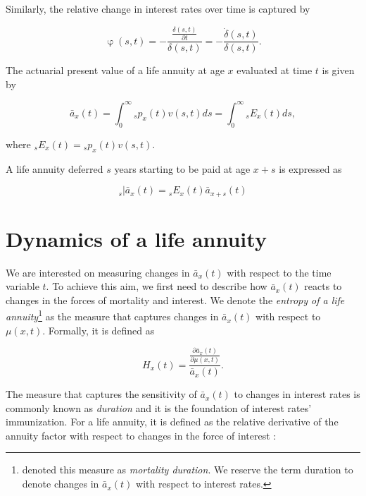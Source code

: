 \documentclass[12pt]{article}
\begin{document}
Similarly, the relative change in interest rates over time is captured by 


\begin{equation} \label{eq:phi}
\upvarphi(s,t)=-\frac{\frac{\delta(s,t)}{\partial t}}{\delta(s,t)} = -\frac{\dot{\delta}(s,t)}{\delta(s,t)}.
\end{equation}


The actuarial present value of a life annuity at age $x$ evaluated at time $t$ is given by

\begin{equation}\label{eq:Annuity}
\bar{a}_x(t) = \int_0^\infty {}_sp_x(t) {v}(s,t)ds = \int_0^\infty {}_sE_x(t) ds,
\end{equation}

where ${}_sE_x(t)={}_sp_x(t) {v}(s,t)$. 



A life annuity deferred $s$ years starting to be paid at age $x+s$ is expressed as


\begin{equation}\label{eq:DefAnnuity}
{}_s|\bar{a}_x(t) = {}_sE_x(t) \bar{a}_{x+s}(t)
\end{equation}


\section{Dynamics of a life annuity}


We are interested on measuring changes in $\bar{a}_x(t)$ with respect to the time variable $t$. To achieve this aim, we first need to describe how $\bar{a}_x(t)$ reacts to changes in the forces of mortality and interest. We denote the \textit{entropy of a life annuity}\footnote{\cite{Tsai2011,Tsai2013a,Lin2020} denoted this measure as \textit{mortality duration}. We reserve the term duration to denote changes in $\bar{a}_x(t)$ with respect to interest rates.} as the measure that captures changes in $\bar{a}_x(t)$ with respect to $\mu(x,t)$. Formally, it is defined as 

\begin{equation}\label{eq:EntropyGeneral}
{H}_{x}(t) = \frac{ \frac{\partial \bar{a}_x(t) }{\partial \mu(x,t)}}{\bar{a}_x(t)}.
\end{equation}

The measure that captures the sensitivity of $\bar{a}_x(t)$ to changes in interest rates is commonly known as \textit{duration} and it is the foundation of interest rates' immunization. For a life annuity, it is defined as the relative derivative of the annuity factor with respect to changes in the force of interest \citep{Milevsky2012}:
\end{document}
